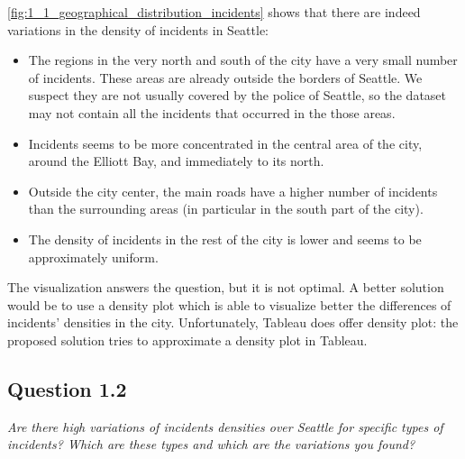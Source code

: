 \cref{fig:1_1_geographical_distribution_incidents} shows that there are indeed variations in the density of incidents in Seattle:
\begin{itemize}
    \item The regions in the very north and south of the city have a very small number of incidents. These areas are already outside the borders of Seattle. We suspect they are not usually covered by the police of Seattle, so the dataset may not contain all the incidents that occurred in the those areas.
    \item Incidents seems to be more concentrated in the central area of the city, around the Elliott Bay, and immediately to its north.
    \item Outside the city center, the main roads have a higher number of incidents than the surrounding areas (in particular in the south part of the city).
    \item The density of incidents in the rest of the city is lower and seems to be approximately uniform.
\end{itemize}

The visualization answers the question, but it is not optimal.
A better solution would be to use a density plot which is able to visualize better the differences of incidents' densities in the city.
Unfortunately, Tableau does offer density plot: the proposed solution tries to approximate a density plot in Tableau.

\subsection*{Question 1.2}
\textit{Are there high variations of incidents densities over Seattle for specific types of incidents? Which are these types and which are the variations you found?}

